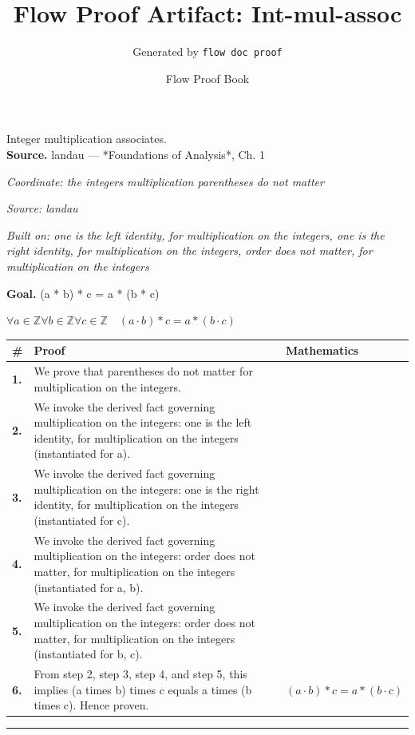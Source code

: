 \documentclass[11pt]{article}
\title{Flow Proof Artifact: Int-mul-assoc}
\author{Generated by \texttt{flow doc proof}}
\date{Flow Proof Book}
\theoremstyle{definition}
\begin{document}
\maketitle
Integer multiplication associates.\\[0.5em]
\textbf{Source.} landau — *Foundations of Analysis*, Ch. 1\\[0.5em]
\bigskip
{}\par
\smallskip\noindent\textit{Coordinate: the integers \cdot multiplication \cdot parentheses do not matter}\par
\smallskip\noindent\textit{Source: landau}\par
\smallskip\noindent\textit{Built on: one is the left identity, for multiplication on the integers, one is the right identity, for multiplication on the integers, order does not matter, for multiplication on the integers}\par
\medskip
\noindent\textbf{Goal.} (a * b) * c = a * (b * c)\par
\noindent$\displaystyle \forall a \in \mathbb{Z} \forall b \in \mathbb{Z} \forall c \in \mathbb{Z}\quad (a \cdot b) * c = a * (b \cdot c)$\par
\medskip
\noindent
\begin{tabular}{@{} >{\raggedright\arraybackslash}p{} >{\raggedright\arraybackslash}p{} >{\raggedleft\arraybackslash}p{} @{}}
\textbf{\#} & \textbf{Proof} & \textbf{Mathematics} \\
\midrule
\textbf{1.} & We prove that parentheses do not matter for multiplication on the integers. & \\[0.45em]
\textbf{2.} & We invoke the derived fact governing multiplication on the integers: one is the left identity, for multiplication on the integers (instantiated for a). & \\[0.45em]
\textbf{3.} & We invoke the derived fact governing multiplication on the integers: one is the right identity, for multiplication on the integers (instantiated for c). & \\[0.45em]
\textbf{4.} & We invoke the derived fact governing multiplication on the integers: order does not matter, for multiplication on the integers (instantiated for a, b). & \\[0.45em]
\textbf{5.} & We invoke the derived fact governing multiplication on the integers: order does not matter, for multiplication on the integers (instantiated for b, c). & \\[0.45em]
\textbf{6.} & From step 2, step 3, step 4, and step 5, this implies (a times b) times c equals a times (b times c). Hence proven. & $\displaystyle (a \cdot b) * c = a * (b \cdot c)$ \\[0.45em]
\bottomrule
\end{tabular}
\label{thm:Int-multiplication-parentheses_do_not_matter}
\par\medskip\hrule
\end{document}
